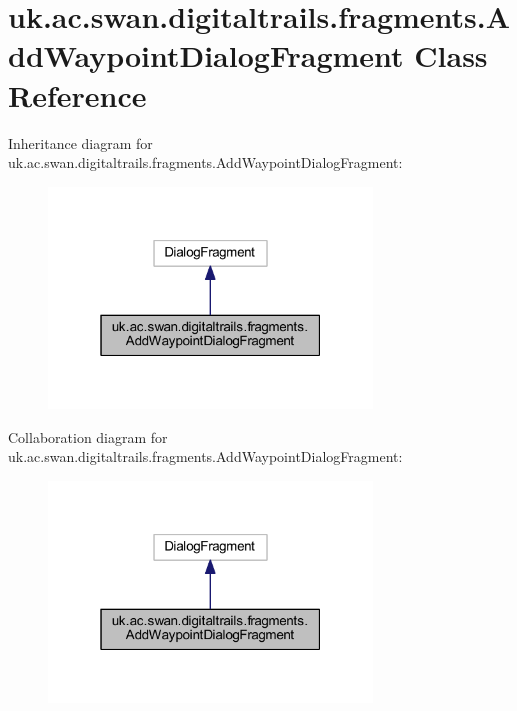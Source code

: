 \hypertarget{classuk_1_1ac_1_1swan_1_1digitaltrails_1_1fragments_1_1_add_waypoint_dialog_fragment}{\section{uk.\+ac.\+swan.\+digitaltrails.\+fragments.\+Add\+Waypoint\+Dialog\+Fragment Class Reference}
\label{classuk_1_1ac_1_1swan_1_1digitaltrails_1_1fragments_1_1_add_waypoint_dialog_fragment}
}


Inheritance diagram for uk.\+ac.\+swan.\+digitaltrails.\+fragments.\+Add\+Waypoint\+Dialog\+Fragment\+:\nopagebreak
\begin{figure}[H]
\begin{center}
\leavevmode
\includegraphics[width=244pt]{classuk_1_1ac_1_1swan_1_1digitaltrails_1_1fragments_1_1_add_waypoint_dialog_fragment__inherit__graph}
\end{center}
\end{figure}


Collaboration diagram for uk.\+ac.\+swan.\+digitaltrails.\+fragments.\+Add\+Waypoint\+Dialog\+Fragment\+:\nopagebreak
\begin{figure}[H]
\begin{center}
\leavevmode
\includegraphics[width=244pt]{classuk_1_1ac_1_1swan_1_1digitaltrails_1_1fragments_1_1_add_waypoint_dialog_fragment__coll__graph}
\end{center}
\end{figure}
